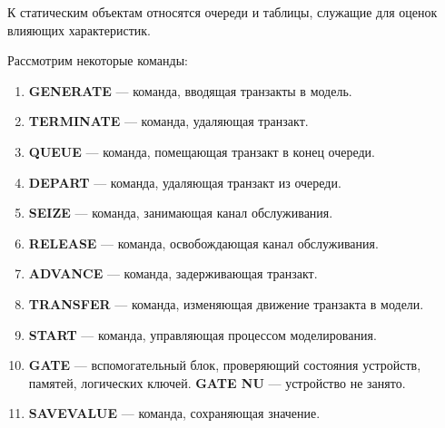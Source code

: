 К статическим объектам относятся очереди и таблицы, служащие
для оценок влияющих характеристик.

Рассмотрим некоторые команды:
\begin{enumerate}
	\item \textbf{GENERATE} --- команда, вводящая транзакты в модель.
	\item \textbf{TERMINATE} ---  команда, удаляющая транзакт.
	\item \textbf{QUEUE} --- команда, помещающая транзакт в конец очереди.
	\item \textbf{DEPART} --- команда, удаляющая транзакт из очереди.
	\item \textbf{SEIZE} --- команда, занимающая канал обслуживания.
	\item \textbf{RELEASE} --- команда, освобождающая канал обслуживания.
	\item \textbf{ADVANCE} ---  команда, задерживающая транзакт.
	\item \textbf{TRANSFER} --- команда, изменяющая движение транзакта в модели.
	\item \textbf{START} --- команда, управляющая процессом моделирования.
	\item \textbf{GATE} --- вспомогательный блок, проверяющий состояния устройств,
	памятей, логических ключей. \textbf{GATE NU} --- устройство не занято.
	\item \textbf{SAVEVALUE} --- команда, сохраняющая значение.
\end{enumerate}